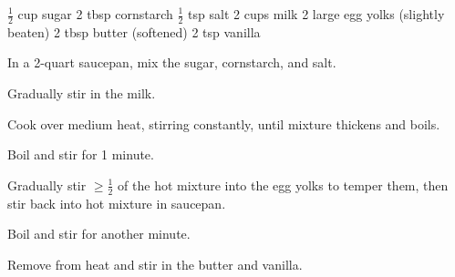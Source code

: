 \dishtype{\dessert}
\dishother{\vegetarian}
\begin{ingreds}
    $\frac{1}{2}$ cup sugar
    2 tbsp cornstarch
    $\frac{1}{2}$ tsp salt
    2 cups milk
    2 large egg yolks (slightly beaten)
    2 tbsp butter (softened)
    2 tsp vanilla
\end{ingreds}
\begin{method}
    In a 2-quart saucepan, mix the sugar, cornstarch, and salt.\par
    Gradually stir in the milk.\par
    Cook over medium heat, stirring constantly, until mixture thickens and boils.\par
    Boil and stir for 1 minute.\par
    Gradually stir $\geq\frac{1}{2}$ of the hot mixture into the egg yolks to temper them, then stir back into hot mixture in saucepan.\par
    Boil and stir for another minute.\par
    Remove from heat and stir in the butter and vanilla.       
\end{method}
